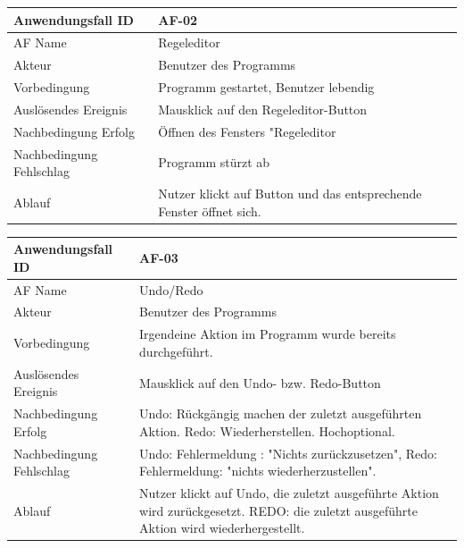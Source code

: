\documentclass[11pt]{article}
\begin{document}
\begin{tabular}[m]{|m{7cm}|m{9cm}|}
    \hline
    Anwendungsfall ID     & AF-02 \\
         \hline
    AF Name     &  Regeleditor \\
         \hline
    Akteur&Benutzer des Programms \\
    \hline
    Vorbedingung&Programm gestartet, Benutzer lebendig\\
    \hline
    Auslösendes Ereignis&Mausklick auf den Regeleditor-Button\\
    \hline
    Nachbedingung Erfolg&Öffnen des Fensters "Regeleditor\\
    \hline
    Nachbedingung Fehlschlag&Programm stürzt ab\\
    \hline
    Ablauf&Nutzer klickt auf Button und das entsprechende Fenster öffnet sich.\\
    \hline
\end{tabular}
\par


\begin{tabular}[m]{|m{7cm}|m{9cm}|}
    \hline
    Anwendungsfall ID     & AF-03  \\
         \hline
    AF Name     &  Undo/Redo \\
         \hline
    Akteur&Benutzer des Programms \\
    \hline
    Vorbedingung&Irgendeine Aktion im Programm wurde bereits durchgeführt.\\
    \hline
    Auslösendes Ereignis&Mausklick auf den Undo- bzw. Redo-Button\\
    \hline
    Nachbedingung Erfolg&Undo: Rückgängig machen der zuletzt ausgeführten Aktion. Redo: Wiederherstellen. Hochoptional.\\
    \hline
    Nachbedingung Fehlschlag&Undo: Fehlermeldung : "Nichts zurückzusetzen", Redo: Fehlermeldung: "nichts wiederherzustellen".\\
    \hline
    Ablauf&Nutzer klickt auf Undo, die zuletzt ausgeführte Aktion wird zurückgesetzt. REDO: die zuletzt ausgeführte Aktion wird wiederhergestellt.\\
    \hline
\end{tabular}
\par
\end{document}
